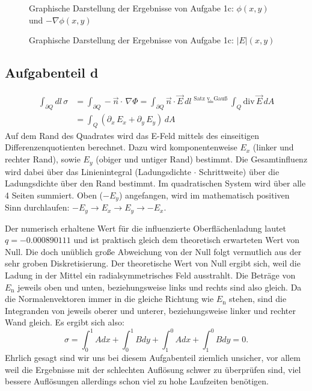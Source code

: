 \begin{landscape}
	\begin{figure}
		\caption{Graphische Darstellung der Ergebnisse von Aufgabe 1c: $\phi(x,y)$ und $-\nabla
        \phi(x,y)$}
		\label{fig:cPhi}
	\end{figure}
\end{landscape}

\begin{landscape}
	\begin{figure}
		\caption{Graphische Darstellung der Ergebnisse von Aufgabe 1c: $|E|(x,y)$}
		\label{fig:cabsE}
	\end{figure}
\end{landscape}

\subsection*{Aufgabenteil d}
\begin{align}		\int_{\partial Q} dl\,\sigma &= \int_{\partial Q} -\vec{n}\cdot \,\nabla \Phi = \int_{\partial Q} 	\vec{n}\cdot \vec{E}\,dl \stackrel{\text{Satz v. Gauß}}{=} \int_{Q} \text{div}\,\vec{E}\, dA \\
		&= \int_{Q} \left(\partial_x \,E_x+\partial_y\,E_y\right)\, dA
\end{align}%
Auf dem Rand des Quadrates wird das E-Feld mittels des einseitigen Differenzenquotienten berechnet.
Dazu wird komponentenweise $E_x$ (linker und rechter Rand), sowie $E_y$ (obiger und untiger Rand)
bestimmt. Die Gesamtinfluenz wird dabei über das Linienintegral (Ladungsdichte $\cdot$ Schrittweite)
über die Ladungsdichte über den Rand bestimmt. Im quadratischen System wird über alle 4 Seiten
summiert. Oben ($-E_y$) angefangen, wird im mathematisch positiven Sinn durchlaufen: $-E_y
\rightarrow E_x \rightarrow E_y \rightarrow -E_x$.
\begin{sloppypar}
Der numerisch erhaltene Wert für die influenzierte Oberflächenladung lautet \mbox{$q = -0.000890111$} und ist praktisch gleich dem theoretisch erwarteten Wert von Null.
Die doch unüblich große Abweichung von der Null folgt vermutlich aus der sehr groben Diskretisierung.
Der theoretische Wert von Null ergibt sich, weil die Ladung in der Mittel ein radialsymmetrisches Feld ausstrahlt.
Die Beträge von $E_\text{n}$ jeweils oben und unten, beziehungsweise links und rechts sind also gleich.
Da die Normalenvektoren immer in die gleiche Richtung wie $E_\text{n}$ stehen, sind die Integranden von jeweils oberer und unterer, beziehungsweise linker und rechter Wand gleich.
Es ergibt sich also:
\begin{equation}
    \sigma = \int_0^1 A dx + \int_0^1 B dy + \int_1^0 A dx + \int_1^0 B dy = 0.
\end{equation}
Ehrlich gesagt sind wir uns bei diesem Aufgabenteil ziemlich unsicher, vor allem weil die Ergebnisse
mit der schlechten Auflösung schwer zu überprüfen sind, viel bessere Auflösungen allerdings schon
viel zu hohe Laufzeiten benötigen.
\end{sloppypar}
